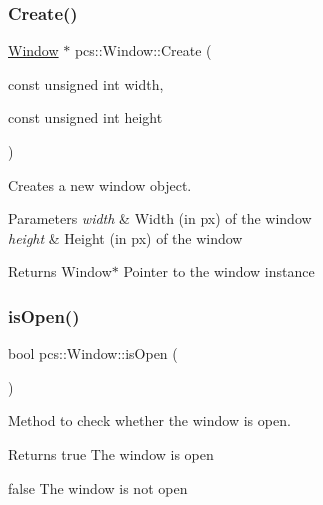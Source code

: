 \mbox{\label{classpcs_1_1Window_af7ab7d729e559b42fb723c57670623da}} 
\subsubsection{\texorpdfstring{Create()}{Create()}}
{\footnotesize\ttfamily \hyperlink{classpcs_1_1Window}{Window} $\ast$ pcs\+::\+Window\+::\+Create (\begin{DoxyParamCaption}\item[{const unsigned int}]{width,  }\item[{const unsigned int}]{height }\end{DoxyParamCaption})\hspace{0.3cm}{\ttfamily [static]}}



Creates a new window object. 


\begin{DoxyParams}{Parameters}
{\em width} & Width (in px) of the window \\
\hline
{\em height} & Height (in px) of the window \\
\hline
\end{DoxyParams}
\begin{DoxyReturn}{Returns}
Window$\ast$ Pointer to the window instance 
\end{DoxyReturn}
\mbox{\label{classpcs_1_1Window_a594d19fb488754f3e863e982ad540928}} 
\subsubsection{\texorpdfstring{is\+Open()}{isOpen()}}
{\footnotesize\ttfamily bool pcs\+::\+Window\+::is\+Open (\begin{DoxyParamCaption}{ }\end{DoxyParamCaption})}



Method to check whether the window is open. 

\begin{DoxyReturn}{Returns}
true The window is open 

false The window is not open 
\end{DoxyReturn}
\mbox{\label{classpcs_1_1Window_a3017fae4b567ecad9f41189b9b8f0281}} 
